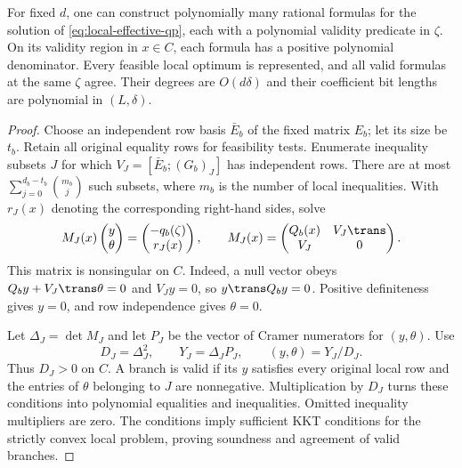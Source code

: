 \begin{lemma}\label{lem:local-branches}
For fixed $d$, one can construct polynomially many rational formulas
for the solution of \eqref{eq:local-effective-qp}, each with a polynomial
validity predicate in $\zeta$. On its validity region in $x\in C$, each
formula has a positive polynomial denominator. Every feasible local
optimum is represented, and all valid formulas at the same $\zeta$
agree. Their degrees are $O(d\delta)$ and their coefficient bit lengths
are polynomial in $(L,\delta)$.
\end{lemma}
\begin{proof}
Choose an independent row basis $\bar E_b$ of the fixed matrix $E_b$;
let its size be $t_b$. Retain all original equality rows for feasibility
tests. Enumerate inequality subsets $J$ for which
$V_J=[\bar E_b;(G_b)_J]$ has independent rows. There are at most
$\sum_{j=0}^{d_b-t_b}\binom{m_b}{j}$ such subsets, where $m_b$ is the
number of local inequalities. With $r_J(x)$ denoting the corresponding
right-hand sides, solve
\begin{equation}\label{eq:block-kkt-system}
 M_J(x)\begin{pmatrix}y\\\theta\end{pmatrix}
 =\begin{pmatrix}-q_b(\zeta)\\r_J(x)\end{pmatrix},\qquad
 M_J(x)=\begin{pmatrix}Q_b(x)&V_J\trans\\V_J&0\end{pmatrix}.
\end{equation}
This matrix is nonsingular on $C$. Indeed, a null vector obeys
$Q_b y+V_J\trans\theta=0$ and $V_Jy=0$, so $y\trans Q_by=0$.
Positive definiteness gives $y=0$, and row independence gives $\theta=0$.

Let $\Delta_J=\det M_J$ and let $P_J$ be the vector of Cramer
numerators for $(y,\theta)$. Use
\[
             D_J=\Delta_J^2,\qquad Y_J=\Delta_J P_J,
             \qquad (y,\theta)=Y_J/D_J.
\]
Thus $D_J>0$ on $C$. A branch is valid if its $y$ satisfies every
original local row and the entries of $\theta$ belonging to $J$ are
nonnegative. Multiplication by $D_J$ turns these conditions into
polynomial equalities and inequalities. Omitted inequality multipliers
are zero. The conditions imply sufficient KKT conditions for the strictly
convex local problem, proving soundness and agreement of valid branches.


\end{proof}
